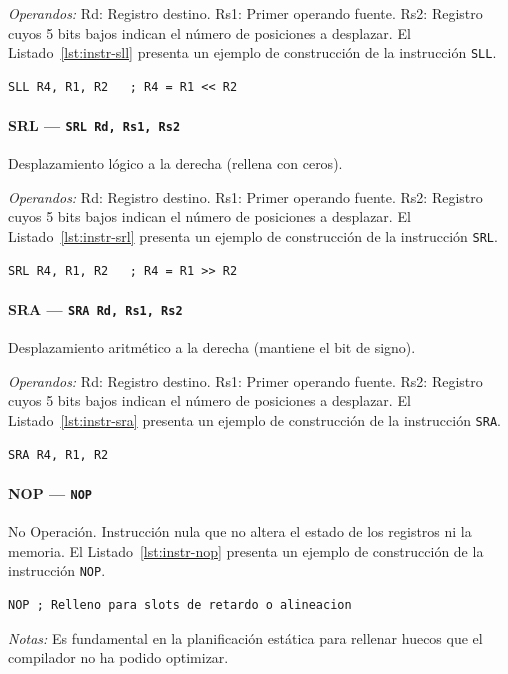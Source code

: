 \documentclass[../main.tex]{subfiles}
\begin{document}
\textit{Operandos:} Rd: Registro destino. Rs1: Primer operando fuente. Rs2: Registro cuyos 5 bits bajos indican el número de posiciones a desplazar.
El Listado~\ref{lst:instr-sll} presenta un ejemplo de construcción de la instrucción \texttt{SLL}.

\begin{lstlisting}[caption={SLL},label={lst:instr-sll}]
	SLL R4, R1, R2   ; R4 = R1 << R2
\end{lstlisting}

\paragraph*{SRL --- \texttt{SRL Rd, Rs1, Rs2}}
Desplazamiento lógico a la derecha (rellena con ceros).

\textit{Operandos:} Rd: Registro destino. Rs1: Primer operando fuente. Rs2: Registro cuyos 5 bits bajos indican el número de posiciones a desplazar.
El Listado~\ref{lst:instr-srl} presenta un ejemplo de construcción de la instrucción \texttt{SRL}.

\begin{lstlisting}[caption={SRL},label={lst:instr-srl}]
	SRL R4, R1, R2   ; R4 = R1 >> R2
\end{lstlisting}

\paragraph*{SRA --- \texttt{SRA Rd, Rs1, Rs2}}
Desplazamiento aritmético a la derecha (mantiene el bit de signo).

\textit{Operandos:} Rd: Registro destino. Rs1: Primer operando fuente. Rs2: Registro cuyos 5 bits bajos indican el número de posiciones a desplazar.
El Listado~\ref{lst:instr-sra} presenta un ejemplo de construcción de la instrucción \texttt{SRA}.

\begin{lstlisting}[caption={SRA},label={lst:instr-sra}]
	SRA R4, R1, R2
\end{lstlisting}

\paragraph*{NOP --- \texttt{NOP}}
No Operación. Instrucción nula que no altera el estado de los registros ni la memoria.
El Listado~\ref{lst:instr-nop} presenta un ejemplo de construcción de la instrucción \texttt{NOP}.

\begin{lstlisting}[caption={NOP},label={lst:instr-nop}]
	NOP ; Relleno para slots de retardo o alineacion
\end{lstlisting}
\textit{Notas:} Es fundamental en la planificación estática para rellenar huecos que el compilador no ha podido optimizar.
\end{document}

